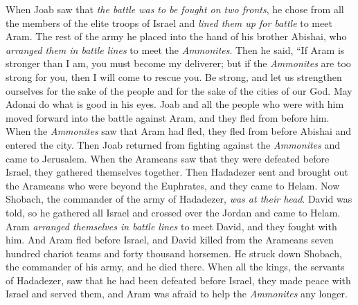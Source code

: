 \begin{biblechapter}
\verse When Joab saw that \textit{the battle was to be fought on two fronts}, he chose from all the members of the elite troops of Israel and \textit{lined them up for battle} to meet Aram.
\verse The rest of the army he placed into the hand of his brother Abishai, who \textit{arranged them in battle lines} to meet the \textit{Ammonites}.
\verse Then he said, “If Aram is stronger than I am, you must become my deliverer; but if the \textit{Ammonites} are too strong for you, then I will come to rescue you.
\verse Be strong, and let us strengthen ourselves for the sake of the people and for the sake of the cities of our God. May Adonai do what is good in his eyes.
\verse Joab and all the people who were with him moved forward into the battle against Aram, and they fled from before him.
\verse When the \textit{Ammonites} saw that Aram had fled, they fled from before Abishai and entered the city. Then Joab returned from fighting against the \textit{Ammonites} and came to Jerusalem.
 When the Arameans saw that they were defeated before Israel, they gathered themselves together.
\verse Then Hadadezer sent and brought out the Arameans who were beyond the Euphrates, and they came to Helam. Now Shobach, the commander of the army of Hadadezer, \textit{was at their head}.
\verse David was told, so he gathered all Israel and crossed over the Jordan and came to Helam. Aram \textit{arranged themselves in battle lines} to meet David, and they fought with him.
\verse And Aram fled before Israel, and David killed from the Arameans seven hundred chariot teams and forty thousand horsemen. He struck down Shobach, the commander of his army, and he died there.
\verse When all the kings, the servants of Hadadezer, saw that he had been defeated before Israel, they made peace with Israel and served them, and Aram was afraid to help the \textit{Ammonites} any longer.
\end{biblechapter}

